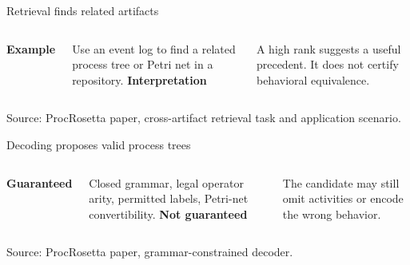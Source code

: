 \documentclass[aspectratio=169,12pt]{beamer}
\newcommand{\paperfigure}[1]{%
  \begingroup
  \newenvironment{figure*}[1][]{\par\centering}{\par}
  \renewcommand{\caption}[1]{}
  \renewcommand{\label}[1]{}
  
  \endgroup
}
\newcommand{\source}[1]{\vfill{\tiny\color{prgray}Source: #1\par}}
\begin{document}
\begin{frame}[t]{Retrieval finds related artifacts}
  \vspace{4mm}
  \begin{center}
  \end{center}
  \vspace{5mm}
  \begin{columns}[T,onlytextwidth]
      \textbf{Example}\par
      \small Use an event log to find a related process tree or Petri net in a repository.
      \textbf{Interpretation}\par
      \small A high rank suggests a useful precedent. It does not certify behavioral equivalence.
  \end{columns}
  \source{ProcRosetta paper, cross-artifact retrieval task and application scenario.}
\end{frame}

\begin{frame}[t]{Decoding proposes valid process trees}
  \vspace{1mm}
  \paperfigure{figures/decoder}
  \vspace{2mm}
  \begin{columns}[T,onlytextwidth]
      \textbf{Guaranteed}\par
      \small Closed grammar, legal operator arity, permitted labels, Petri-net convertibility.
      \textbf{Not guaranteed}\par
      \small The candidate may still omit activities or encode the wrong behavior.
  \end{columns}
  \source{ProcRosetta paper, grammar-constrained decoder.}
\end{frame}
\end{document}
